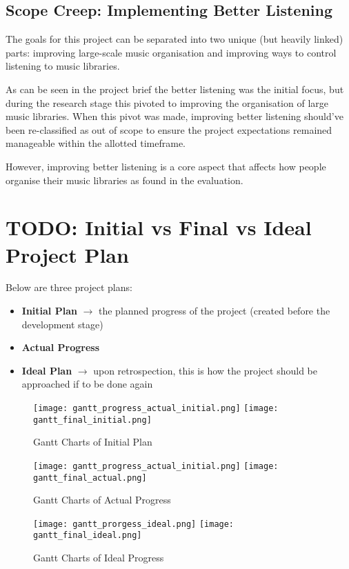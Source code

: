\subsection{Scope Creep: Implementing Better Listening}
The goals for this project can be separated into two unique (but heavily linked) parts: improving large-scale music organisation and improving ways to control listening to music libraries.

As can be seen in the project brief the better listening was the initial focus, but during the research stage this pivoted to improving the organisation of large music libraries. When this pivot was made, improving better listening should've been re-classified as out of scope to ensure the project expectations remained manageable within the allotted timeframe.

However, improving better listening is a core aspect that affects how people organise their music libraries as found in the evaluation.

\section{TODO: Initial vs Final vs Ideal Project Plan}
Below are three project plans:\begin{itemize}
    \item \textbf{Initial Plan} \(\to\) the planned progress of the project (created before the development stage)
    \item \textbf{Actual Progress}
    \item \textbf{Ideal Plan} \(\to\) upon retrospection, this is how the project should be approached if to be done again
\end{itemize}

\begin{figure}[h]
    \centering
    \texttt{[image: gantt\_progress\_actual\_initial.png]}
    \texttt{[image: gantt\_final\_initial.png]}
    \caption{Gantt Charts of Initial Plan}
\end{figure}

\begin{figure}[h]
    \centering
    \texttt{[image: gantt\_progress\_actual\_initial.png]}
    \texttt{[image: gantt\_final\_actual.png]}
    \caption{Gantt Charts of Actual Progress}
\end{figure}

\begin{figure}[h]
    \centering
    \texttt{[image: gantt\_prorgess\_ideal.png]}
    \texttt{[image: gantt\_final\_ideal.png]}
    \caption{Gantt Charts of Ideal Progress}
\end{figure}